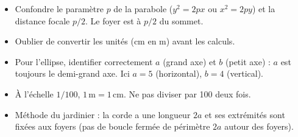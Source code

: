 \documentclass[11pt]{article}
\begin{document}
\begin{attention}
\begin{itemize}
    \item Confondre le paramètre $p$ de la parabole ($y^2=2px$ ou $x^2=2py$) et la distance focale $p/2$. Le foyer est à $p/2$ du sommet.
    \item Oublier de convertir les unités (cm en m) avant les calculs.
    \item Pour l'ellipse, identifier correctement $a$ (grand axe) et $b$ (petit axe) : $a$ est toujours le demi-grand axe. Ici $a=5$ (horizontal), $b=4$ (vertical).
    \item À l'échelle $1/100$, $1\,\text{m} = 1\,\text{cm}$. Ne pas diviser par 100 deux fois.
    \item Méthode du jardinier : la corde a une longueur $2a$ et ses extrémités sont fixées aux foyers (pas de boucle fermée de périmètre $2a$ autour des foyers).
\end{itemize}
\end{attention}
\end{document}
